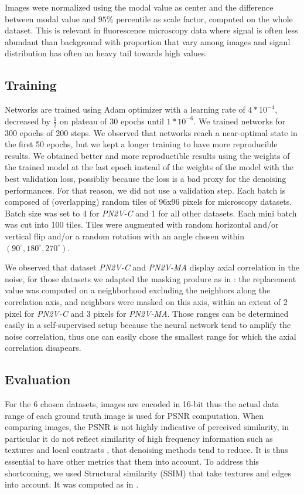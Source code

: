 \documentclass{article}
\begin{document}
Images were normalized using the modal value as center and the difference between modal value and $95\%$ percentile as scale factor, computed on the whole dataset. This is relevant in fluorescence microscopy data where signal is often less abundant than background with proportion that vary among images and siganl distribution has often an heavy tail towards high values.

\subsection{Training}
Networks are trained using Adam optimizer with a learning rate of $4*10^{-4}$, decreased by $\frac{1}{2}$ on plateau of 30 epochs until $1*10^{-6}$. We trained networks for 300 epochs of 200 steps. We observed that networks reach a near-optimal state in the first 50 epochs, but we kept a longer training to have more reproducible results.
We obtained better and more reproductible results using the weights of the trained model at the last epoch instead of the weights of the model with the best validation loss, possibliy because the loss is a bad proxy for the denoising performances. For that reason, we did not use a validation step.
Each batch is composed of (overlapping) random tiles of 96x96 pixels for microscopy datasets.
Batch size was set to 4 for \emph{PN2V-C} and 1 for all other datasets.
Each mini batch was cut into 100 tiles.
Tiles were augmented with random horizontal and/or vertical flip and/or a random rotation with an angle chosen within $(90^\circ, 180^\circ, 270^\circ)$.

We observed that dataset \emph{PN2V-C} and \emph{PN2V-MA} display axial correlation in the noise, for those datasets we adapted the masking produre as in \cite{broaddus2020removing}: the replacement value was computed on a neighborhood excluding the neighbors along the correlation axis, and neighbors were masked on this axis, within an extent of 2 pixel for \emph{PN2V-C} and 3 pixels for \emph{PN2V-MA}.
Those ranges can be determined easily in a self-supervised setup because the neural network tend to amplify the noise correlation, thus one can easily chose the smallest range for which the axial correlation disapears.

\subsection{Evaluation}
For the 6 chosen datasets, images are encoded in 16-bit thus the actual data range of each ground truth image is used for PSNR computation.
When comparing images, the PSNR is not highly indicative of perceived similarity, in particular it do not reflect similarity of high frequency information such as textures and local contrasts \cite{wang2004image}, that denoising methods tend to reduce. It is thus essential to have other metrics that them into account.
To address this shortcoming, we used Structural similarity (SSIM) that take textures and edges into account. It was computed as in \cite{wang2004image}.
\end{document}
